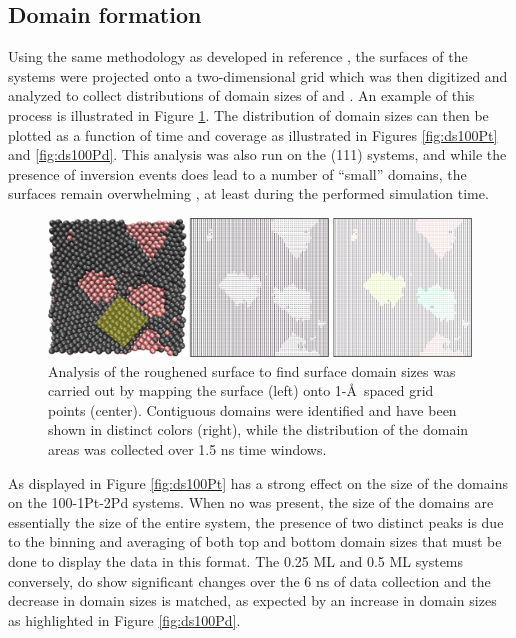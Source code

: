 \subsection{Domain formation}
Using the same methodology as developed in reference \citep{Michalka:2015aa},
the surfaces of the systems were projected onto a two-dimensional grid which
was then digitized and analyzed to collect distributions of domain sizes of
 and . An example of this process is illustrated in Figure
\ref{fig:surfaceGrid}. 
The distribution of domain sizes can then be plotted as a
function of time and  coverage as illustrated in Figures
\ref{fig:ds100Pt} and \ref{fig:ds100Pd}. This analysis was also run on the
(111) systems, and while the presence of inversion events does lead to a number
of ``small''  domains, the surfaces remain overwhelming , at
least during the performed simulation time.

\begin{landscape}
\begin{figure}[p!]
\centering
  \includegraphics[width=\linewidth]{../figures/appD/grid_small.pdf}
  \caption{Analysis of the roughened surface to find surface domain sizes was
carried out by mapping the surface (left) onto 1-\AA\ spaced grid
points (center). Contiguous domains were identified and have been shown in
distinct colors (right), while the distribution of the domain areas was collected
over 1.5 ns time windows.}
\label{fig:surfaceGrid}
\end{figure}
\end{landscape}

As displayed in Figure \ref{fig:ds100Pt}  has a strong effect on the
size of the  domains on the 100-1Pt-2Pd systems. When no  was
present, the size of the domains are essentially the size of the entire system,
the presence of two distinct peaks is due to the binning and averaging of both
top and bottom domain sizes that must be done to display the data in this
format. The 0.25 ML and 0.5 ML systems conversely, do show significant changes
over the 6 ns of data collection and the decrease in  domain sizes is
matched, as expected by an increase in  domain sizes as highlighted in
Figure \ref{fig:ds100Pd}. 

